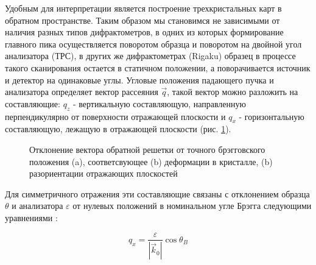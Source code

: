 Удобным для интерпретации является построение трехкристальных карт в обратном пространстве.  Таким
образом мы становимся не зависимыми от наличия разных типов дифрактометров, в одних из которых
формирование главного пика осуществляется поворотом образца и поворотом на двойной угол анализатора (ТРС),
в других же дифрактометрах (Rigaku) образец в процессе такого сканирования остается в статичном положении,
а поворачивается источник и детектор на одинаковые углы. Угловые положения падающего пучка и анализатора
определяет вектор рассеяния $\vec{q}$, такой вектор можно разложить на составляющие: $q_z$ - вертикальную составляющую,
направленную перпендикулярно от поверхности отражающей плоскости и $q_x$ - горизонтальную составляющую,
лежащую в отражающей плоскости (рис. \ref{ris:q_vector_reciprocal_space}).

\begin{figure}[H]
  \centering
  \hfill
  \hfill
  \caption{Отклонение вектора обратной решетки от точного брэгговского положения (a), соответсвующее (b) деформации
  в кристалле, (b) разориентации отражающих плоскостей  }
  \label{ris:q_vector_reciprocal_space}
\end{figure}

Для симметричного отражения эти составляющие связаны с отклонением образца $\theta$ и
анализатора $\varepsilon$ от нулевых положений в номинальном угле Брэгга следующими
уравнениями \cite{Tanner_1998}:

\begin{equation}
  q_x = \frac{\varepsilon}{|\vec{k}_0|} \cos \theta_B
  \label{eq:qx_eqn}
\end{equation}

